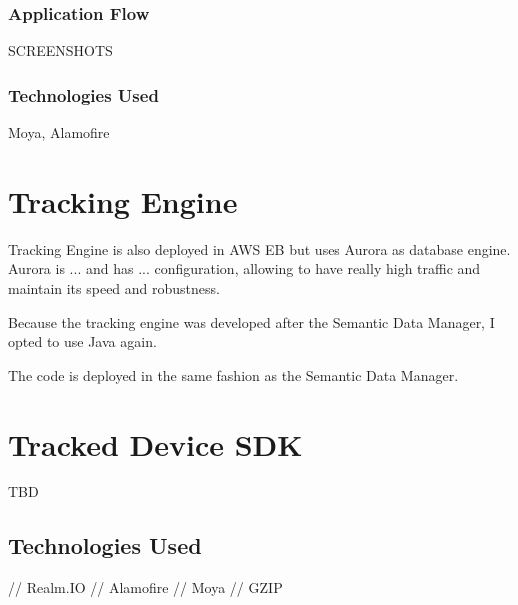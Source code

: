 \subsubsection{Application Flow}

SCREENSHOTS

\subsubsection{Technologies Used}

Moya, Alamofire

\section{Tracking Engine}

Tracking Engine is also deployed in AWS EB but uses Aurora as database engine. Aurora is ... and has ... configuration, allowing to have really high traffic and maintain its speed and robustness.

Because the tracking engine was developed after the Semantic Data Manager, I opted to use Java again. 

The code is deployed in the same fashion as the Semantic Data Manager.

\section{Tracked Device SDK}

TBD

\subsection{Technologies Used}

// Realm.IO
// Alamofire
// Moya
// GZIP